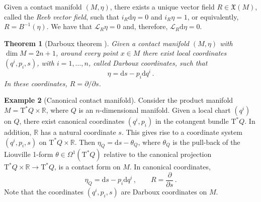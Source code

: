 \documentclass[11pt]{article}
\theoremstyle{plain}
\newtheorem{theorem}{Theorem}[section]
\theoremstyle{definition}
\newtheorem{example}[theorem]{Example}
\newcommand{\R}{\mathbb{R}}
\renewcommand{\d}{\mathrm{d}}
\newcommand{\T}{{\mathrm T}}
\newcommand{\cT}{\T^{\ast}}
\newcommand{\Lie}{\mathscr{L}}
\newcommand{\X}{\mathfrak{X}}
\newcommand{\parder}[2]{\frac{\partial #1}{\partial #2}}
\newcommand{\tparder}[2]{\partial #1/\partial #2}
\def\d{\mathrm{d}}
\def\X{\mathfrak{X}}
\def\d{\mathrm{d}}
\def\Lie{\mathscr{L}}
\begin{document}
Given a contact manifold $(M,\eta)$, there exists a unique vector field $R\in\X(M)$, called the {\sl  Reeb vector field}, such that $i_{R}\d\eta = 0$ and $i_{R}\eta = 1$, or equivalently, $R = B^{-1}(\eta)$. We have that $\Lie_R\eta = 0$ and, therefore, $\Lie_R\d\eta = 0$.

\begin{theorem}[Darboux theorem \cite{AM_78,LM_87}]
    Given a contact manifold $(M,\eta)$ with $\dim M=2n+1$, around every point $x\in M$ there exist local coordinates $(q^i, p_i, s)$, with $i = 1,\dotsc,n$, called {\sl  Darboux coordinates}, such that
    $$ \eta = \d s - p_i\d q^i\,. $$
    In these coordinates, $R = \tparder{}{s}$.
\end{theorem}

\begin{example}[Canonical contact manifold]\label{ex:2.2}
Consider the product manifold $M = \cT Q\times\R$, where $Q$ is an $n$-dimensional manifold. Given a local chart $(q^i)$ on $Q$, there exist canonical coordinates $(q^i,p_i)$ in the cotangent bundle $\cT Q$. In addition, $\R$ has a natural coordinate $s$. This gives rise to a coordinate system $(q^i, p_i, s)$ on $\cT Q\times \R$. Then $\eta_Q = \d s - \theta_Q$, where $\theta_Q$ is the pull-back of the Liouville 1-form $\theta\in\Omega^1(\cT Q)$ relative to the canonical projection $\cT Q\times \R\to\cT Q$, is a contact form on $M$. In canonical coordinates, 
$$ \eta_Q = \d s - p_i\d q^i\,,\qquad R=\parder{}{s}\,.$$
    Note that the coordinates $(q^i,p_i,s)$ are Darboux coordinates on $M$. 
\end{example}
\end{document}
